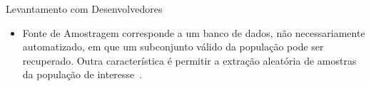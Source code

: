 \documentclass[t,14pt,mathserif]{beamer}
\begin{document}
\begin{frame}{Levantamento com Desenvolvedores}

    \begin{itemize}
        \item {Fonte de Amostragem} corresponde a um banco de dados, não
            necessariamente automatizado, em que um subconjunto válido da
            população pode ser recuperado. Outra característica é permitir a
            extração aleatória de amostras da população de
            interesse~\cite{de2014towards}.
    \end{itemize}

    \begin{table}[htpb]
        \centering
        \caption{Fontes de Amostragem utilizadas no estudo}
\label{tab:fontes-amostragens}
    \end{table}
\end{frame}
\end{document}
